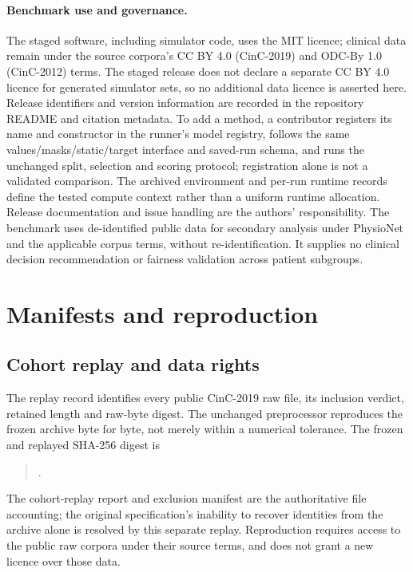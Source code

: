\paragraph{Benchmark use and governance.}
The staged software, including simulator code, uses the MIT licence; clinical data remain under the source corpora's CC BY 4.0 (CinC-2019) and ODC-By 1.0 (CinC-2012) terms. The staged release does not declare a separate CC BY 4.0 licence for generated simulator sets, so no additional data licence is asserted here. Release identifiers and version information are recorded in the repository README and citation metadata. To add a method, a contributor registers its name and constructor in the runner's model registry, follows the same values/masks/static/target interface and saved-run schema, and runs the unchanged split, selection and scoring protocol; registration alone is not a validated comparison. The archived environment and per-run runtime records define the tested compute context rather than a uniform runtime allocation. Release documentation and issue handling are the authors' responsibility. The benchmark uses de-identified public data for secondary analysis under PhysioNet and the applicable corpus terms, without re-identification. It supplies no clinical decision recommendation or fairness validation across patient subgroups.


\section{Manifests and reproduction}\label{app:manifests}
\subsection{Cohort replay and data rights}
The replay record identifies every public CinC-2019 raw file, its inclusion verdict, retained length and raw-byte digest. The unchanged preprocessor reproduces the frozen archive byte for byte, not merely within a numerical tolerance. The frozen and replayed SHA-256 digest is
\begin{quote}\small{}.\end{quote}
The cohort-replay report and exclusion manifest are the authoritative file accounting; the original specification's inability to recover identities from the archive alone is resolved by this separate replay. Reproduction requires access to the public raw corpora under their source terms, and does not grant a new licence over those data.


